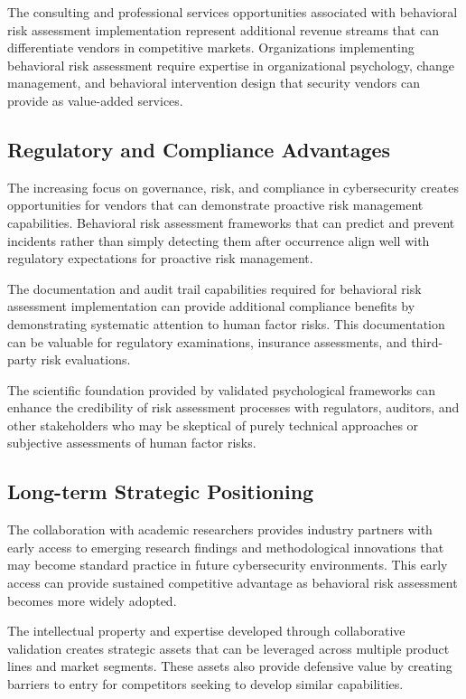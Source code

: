 \documentclass[10pt,twocolumn]{IEEEtran}
\begin{document}
The consulting and professional services opportunities associated with behavioral risk assessment implementation represent additional revenue streams that can differentiate vendors in competitive markets. Organizations implementing behavioral risk assessment require expertise in organizational psychology, change management, and behavioral intervention design that security vendors can provide as value-added services.

\subsection{Regulatory and Compliance Advantages}

The increasing focus on governance, risk, and compliance in cybersecurity creates opportunities for vendors that can demonstrate proactive risk management capabilities. Behavioral risk assessment frameworks that can predict and prevent incidents rather than simply detecting them after occurrence align well with regulatory expectations for proactive risk management.

The documentation and audit trail capabilities required for behavioral risk assessment implementation can provide additional compliance benefits by demonstrating systematic attention to human factor risks. This documentation can be valuable for regulatory examinations, insurance assessments, and third-party risk evaluations.

The scientific foundation provided by validated psychological frameworks can enhance the credibility of risk assessment processes with regulators, auditors, and other stakeholders who may be skeptical of purely technical approaches or subjective assessments of human factor risks.

\subsection{Long-term Strategic Positioning}

The collaboration with academic researchers provides industry partners with early access to emerging research findings and methodological innovations that may become standard practice in future cybersecurity environments. This early access can provide sustained competitive advantage as behavioral risk assessment becomes more widely adopted.

The intellectual property and expertise developed through collaborative validation creates strategic assets that can be leveraged across multiple product lines and market segments. These assets also provide defensive value by creating barriers to entry for competitors seeking to develop similar capabilities.
\end{document}
